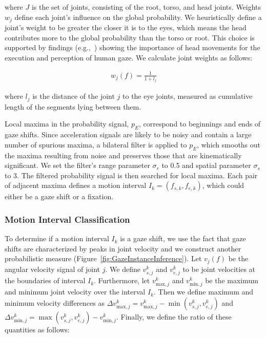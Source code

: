 where $J$ is the set of joints, consisting of the root, torso, and head joints. Weights $w_j$ define each joint's influence on the global probability. We heuristically define a joint's weight to be greater the closer it is to the eyes, which means the head contributes more to the global probability than the torso or root. This choice is supported by findings (e.g.,~\citep{hietanen1999does}) showing the importance of head movements for the execution and perception of human gaze. We calculate joint weights as follows:

\begin{align} \label{eq:GazeJointWeight}
w_j(f) = \frac{1}{1 + l_j}
\end{align}

where $l_j$ is the distance of the joint $j$ to the eye joints, measured as cumulative length of the segments lying between them.

Local maxima in the probability signal, $p_E$, correspond to beginnings and ends of gaze shifts. Since acceleration signals are likely to be noisy and contain a large number of spurious maxima, a bilateral filter is applied to $p_E$, which smooths out the maxima resulting from noise and preserves those that are kinematically significant. We set the filter's range parameter $\sigma_r$ to 0.5 and spatial parameter $\sigma_s$ to 3. The filtered probability signal is then searched for local maxima. Each pair of adjacent maxima defines a motion interval $I_k = (f_{s,k}, f_{e,k})$, which could either be a gaze shift or a fixation.

\subsubsection{Motion Interval Classification}

To determine if a motion interval $I_k$ is a gaze shift, we use the fact that gaze shifts are characterized by peaks in joint velocity and we construct another probabilistic measure (Figure~\ref{fig:GazeInstanceInference}). Let $v_j(f)$ be the angular velocity signal of joint $j$. We define $v_{s,j}^k$ and $v_{e,j}^k$ to be joint velocities at the boundaries of interval $I_k$. Furthermore, let $v_{\mathrm{max},j}^k$ and $v_{\mathrm{min},j}^k$ be the maximum and minimum joint velocity over the interval $I_k$. Then we define maximum and minimum velocity differences as $\Delta v_{\mathrm{max},j}^k = v_{\mathrm{max},j}^k - \mathop{min} (v_{s,j}^k, v_{e,j}^k)$ and $\Delta v_{\mathrm{min},j}^k = \mathop{max} (v_{s,j}^k, v_{e,j}^k) - v_{\mathrm{min},j}^k$. Finally, we define the ratio of these quantities as follows:

